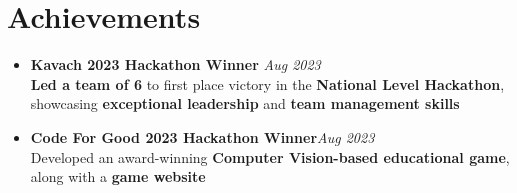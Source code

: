 \section{Achievements}
\begin{itemize}
    \item \textbf{Kavach 2023 Hackathon Winner}  \hfill \textit{Aug 2023} \\ 
    \textbf{Led a team of 6} to first place victory in the \textbf{National Level Hackathon}, showcasing \textbf{exceptional leadership} and \textbf{team management skills}
    \item \textbf{Code For Good 2023 Hackathon Winner}\hfill \textit{Aug 2023} \\  
    Developed an award-winning \textbf{Computer Vision-based educational game}, along with a \textbf{game website}
    
\end{itemize} 